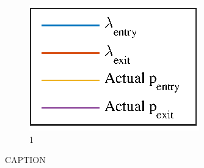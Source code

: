 \begin{figure}[htbp]
	\hspace*{\fill}
	\begin{subfigure}[t]{0.5\linewidth}
		\centering
		\includegraphics[scale = 1]{chapters/appendix/figures/learning_curves/legend}
		\caption{1}
	\end{subfigure}
	\hspace*{\fill}

	\caption{CAPTION}
	\label{fig:all_learnings_sim_1}
\end{figure}

